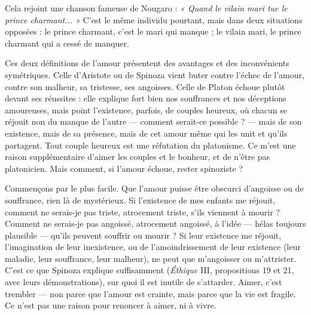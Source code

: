 Cela rejoint une chanson fameuse de Nougaro : {\it « Quand le vilain mari tue
le prince charmant... »} C’est le même individu pourtant, mais dans deux situations
opposées : le prince charmant, c’est le mari qui manque ; le vilain mari, le
prince charmant qui a cessé de manquer.

Ces deux définitions de l’amour présentent des avantages et des inconvénients
symétriques. Celle d’Aristote ou de Spinoza vient buter contre l'échec de
l'amour, contre son malheur, sa tristesse, ses angoisses. Celle de Platon échoue
plutôt devant ses réussites : elle explique fort bien nos souffrances et nos déceptions
amoureuses, mais point l'existence, parfois, de couples heureux, où
chacun se réjouit non du manque de l’autre — comment serait-ce possible ? —
mais de son existence, mais de sa présence, mais de cet amour même qui les
unit et qu’ils partagent. Tout couple heureux est une réfutation du platonisme.
Ce m'est une raison supplémentaire d’aimer les couples et le bonheur, et de
n’être pas platonicien. Mais comment, si l'amour échoue, rester spinoziste ?

Commençons par le plus facile. Que l'amour puisse être obscurci d’angoisse
ou de souffrance, rien là de mystérieux. Si l'existence de mes enfants me
réjouit, comment ne serais-je pas triste, atrocement triste, s'ils viennent à
mourir ? Comment ne serais-je pas angoissé, atrocement angoissé, à l’idée —
hélas toujours plausible — qu’ils peuvent souffrir ou mourir ? Si leur existence
me réjouit, l'imagination de leur inexistence, ou de l’amoindrissement de leur
existence (leur maladie, leur souffrance, leur malheur), ne peut que m’angoisser
ou m’attrister. C’est ce que Spinoza explique suffisamment ({\it Éthique} III, propositions
19 et 21, avec leurs démonstrations), sur quoi il est inutile de s’attarder.
Aimer, c’est trembler — non parce que l’amour est crainte, mais parce que la vie
est fragile. Ce n’est pas une raison pour renoncer à aimer, ni à vivre.

